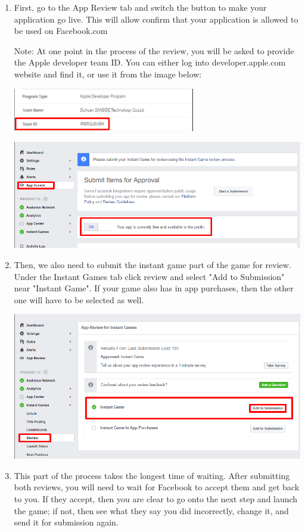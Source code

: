 \documentclass{article}
\begin{document}
\begin{enumerate}
\item First, go to the App Review tab and switch the button to make your application go live. This will allow confirm that your application is allowed to be used on Facebook.com

Note: At one point in the process of the review, you will be asked to provide the Apple developer team ID. You can either log into developer.apple.com website and find it, or use it from the image below:

\begin{center}
\includegraphics[width=300px]{images/apple.png}
\end{center}

\begin{center}
\includegraphics[width=\textwidth]{images/appreview.png}
\end{center}
\item Then, we also need to submit the instant game part of the game for review. Under the Instant Games tab click review and select "Add to Submission" near "Instant Game". If your game also has in app purchases, then the other one will have to be selected as well. 
\begin{center}
\includegraphics[width=\textwidth]{images/instantreview.png}
\end{center}
\item This part of the process takes the longest time of waiting. After submitting both reviews, you will need to wait for Facebook to accept them and get back to you. If they accept, then you are clear to go onto the next step and launch the game; if not, then see what they say you did incorrectly, change it, and send it for submission again.
\end{enumerate}
\end{document}
